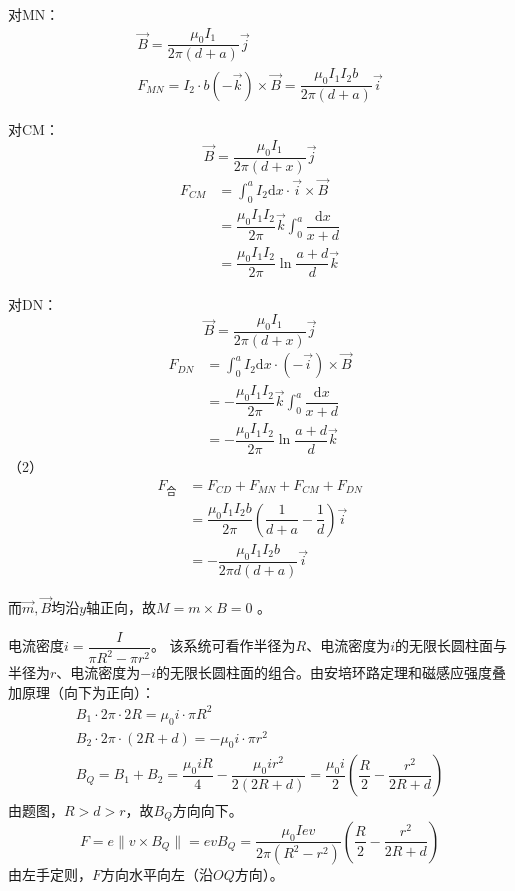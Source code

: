 \documentclass[b5paper,opensource,sourcefont,parskip]{qyxf-book}
\newcommand{\di}[1]{\mathrm{d}#1}
\begin{document}
对MN：
\begin{gather*}
	\vec{B}=\dfrac{\mu_0I_1}{2\pi (d+a)}\vec{j}\\
	F_{MN}=I_2\cdot b(-\vec{k})\times \vec{B}=\dfrac{\mu_0I_1I_2b}{2\pi (d+a)}\vec{i}
\end{gather*}

对CM：
\[
\vec{B}=\dfrac{\mu_0I_1}{2\pi (d+x)}\vec{j}
\]
\begin{align*}
	F_{CM}&=\int_{0}^{a}I_2\di{x}\cdot\vec{i}\times \vec{B}\\
	&=\dfrac{\mu_0I_1I_2}{2\pi}\vec{k}\int_{0}^{a}\dfrac{\di{x}}{x+d}\\
	&=\dfrac{\mu_0I_1I_2}{2\pi}\ln\dfrac{a+d}{d}\vec{k}
\end{align*}

对DN：
\[
\vec{B}=\dfrac{\mu_0I_1}{2\pi (d+x)}\vec{j}
\]
\begin{align*}
	F_{DN}&=\int_{0}^{a}I_2\di{x}\cdot(-\vec{i})\times \vec{B}\\
	&=-\dfrac{\mu_0I_1I_2}{2\pi}\vec{k}\int_{0}^{a}\dfrac{\di{x}}{x+d}\\
	&=-\dfrac{\mu_0I_1I_2}{2\pi}\ln\dfrac{a+d}{d}\vec{k}
\end{align*}
（2）
\begin{align*}
	F_\text{合}&=F_{CD}+F_{MN}+F_{CM}+F_{DN}\\
	&=\dfrac{\mu_0I_1I_2b}{2\pi}(\dfrac{1}{d+a}-\dfrac{1}{d})\vec{i}\\
	&=-\dfrac{\mu_0I_1I_2b}{2\pi d(d+a)}\vec{i}
\end{align*}

而$\vec{m},\vec{B}$均沿$y$轴正向，故$M=m\times B=0$
\footnotemark[5]。


\solve
电流密度$i=\dfrac{I}{\pi R^2-\pi r^2}$。
该系统可看作半径为$R$、电流密度为$i$的无限长圆柱面与半径为$r$、电流密度为$-i$的无限长圆柱面的组合。由安培环路定理和磁感应强度叠加原理（向下为正向）：
\begin{gather*}
	B_1\cdot 2\pi\cdot 2R=\mu_0i\cdot\pi R^2\\
	B_2\cdot 2\pi\cdot (2R+d)=-\mu_0i\cdot\pi r^2\\
	B_Q=B_1+B_2=\dfrac{\mu_0iR}{4}-\dfrac{\mu_0ir^2}{2(2R+d)}=\dfrac{\mu_0i}{2}(\dfrac{R}{2}-\dfrac{r^2}{2R+d})
\end{gather*}
由题图，$R>d>r$，故$B_Q$方向向下。
\[
F=e\|v\times B_Q\|=evB_Q=\dfrac{\mu_0Iev}{2\pi(R^2-r^2)}(\dfrac{R}{2}-\dfrac{r^2}{2R+d})
\]
由左手定则，$F$方向水平向左（沿$OQ$方向）。
\end{document}
